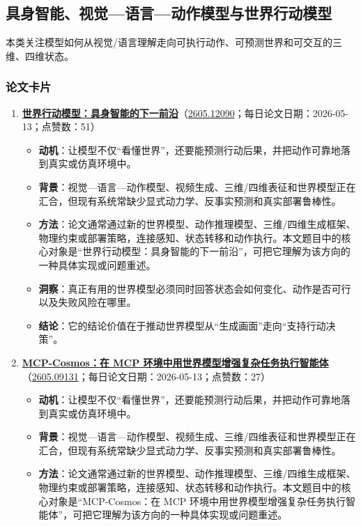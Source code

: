 \subsection{具身智能、视觉—语言—动作模型与世界行动模型}

本类关注模型如何从视觉/语言理解走向可执行动作、可预测世界和可交互的三维、四维状态。

\subsubsection{论文卡片}
\begin{enumerate}[leftmargin=1.5em]
  \item \textbf{\href{https://huggingface.co/papers/2605.12090}{世界行动模型：具身智能的下一前沿}}（\href{https://arxiv.org/abs/2605.12090}{2605.12090}；每日论文日期：2026-05-13；点赞数：51）
  \begin{itemize}[leftmargin=1.5em]
    \item \textbf{动机}：让模型不仅“看懂世界”，还要能预测行动后果，并把动作可靠地落到真实或仿真环境中。
    \item \textbf{背景}：视觉—语言—动作模型、视频生成、三维/四维表征和世界模型正在汇合，但现有系统常缺少显式动力学、反事实预测和真实部署鲁棒性。
    \item \textbf{方法}：论文通常通过新的世界模型、动作推理模型、三维/四维生成框架、物理约束或部署策略，连接感知、状态转移和动作执行。本文题目中的核心对象是“世界行动模型：具身智能的下一前沿”，可把它理解为该方向的一种具体实现或问题重述。
    \item \textbf{洞察}：真正有用的世界模型必须同时回答状态会如何变化、动作是否可行以及失败风险在哪里。
    \item \textbf{结论}：它的结论价值在于推动世界模型从“生成画面”走向“支持行动决策”。
  \end{itemize}
  \item \textbf{\href{https://huggingface.co/papers/2605.09131}{MCP-Cosmos：在 MCP 环境中用世界模型增强复杂任务执行智能体}}（\href{https://arxiv.org/abs/2605.09131}{2605.09131}；每日论文日期：2026-05-13；点赞数：27）
  \begin{itemize}[leftmargin=1.5em]
    \item \textbf{动机}：让模型不仅“看懂世界”，还要能预测行动后果，并把动作可靠地落到真实或仿真环境中。
    \item \textbf{背景}：视觉—语言—动作模型、视频生成、三维/四维表征和世界模型正在汇合，但现有系统常缺少显式动力学、反事实预测和真实部署鲁棒性。
    \item \textbf{方法}：论文通常通过新的世界模型、动作推理模型、三维/四维生成框架、物理约束或部署策略，连接感知、状态转移和动作执行。本文题目中的核心对象是“MCP-Cosmos：在 MCP 环境中用世界模型增强复杂任务执行智能体”，可把它理解为该方向的一种具体实现或问题重述。

\end{itemize}
\end{enumerate}
